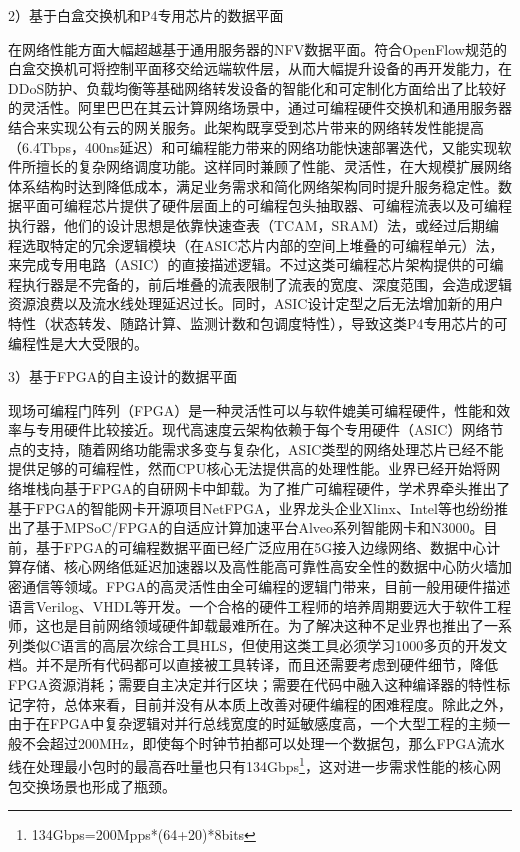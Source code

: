 2）基于白盒交换机和P4专用芯片的数据平面

在网络性能方面大幅超越基于通用服务器的NFV数据平面。符合OpenFlow规范的白盒交换机可将控制平面移交给远端软件层，从而大幅提升设备的再开发能力，在DDoS防护、负载均衡等基础网络转发设备的智能化和可定制化方面给出了比较好的灵活性。阿里巴巴在其云计算网络场景中，通过可编程硬件交换机和通用服务器结合来实现公有云的网关服务。此架构既享受到芯片带来的网络转发性能提高（6.4Tbps，400ns延迟）和可编程能力带来的网络功能快速部署迭代，又能实现软件所擅长的复杂网络调度功能。这样同时兼顾了性能、灵活性，在大规模扩展网络体系结构时达到降低成本，满足业务需求和简化网络架构同时提升服务稳定性。数据平面可编程芯片提供了硬件层面上的可编程包头抽取器、可编程流表以及可编程执行器，他们的设计思想是依靠快速查表（TCAM，SRAM）法，或经过后期编程选取特定的冗余逻辑模块（在ASIC芯片内部的空间上堆叠的可编程单元）法，来完成专用电路（ASIC）的直接描述逻辑。不过这类可编程芯片架构提供的可编程执行器是不完备的，前后堆叠的流表限制了流表的宽度、深度范围，会造成逻辑资源浪费以及流水线处理延迟过长。同时，ASIC设计定型之后无法增加新的用户特性（状态转发、随路计算、监测计数和包调度特性），导致这类P4专用芯片的可编程性是大大受限的。

3）基于FPGA的自主设计的数据平面

现场可编程门阵列（FPGA）是一种灵活性可以与软件媲美可编程硬件，性能和效率与专用硬件比较接近。现代高速度云架构依赖于每个专用硬件（ASIC）网络节点的支持，随着网络功能需求多变与复杂化，ASIC类型的网络处理芯片已经不能提供足够的可编程性，然而CPU核心无法提供高的处理性能。业界已经开始将网络堆栈向基于FPGA的自研网卡中卸载。为了推广可编程硬件，学术界牵头推出了基于FPGA的智能网卡开源项目NetFPGA，业界龙头企业Xlinx、Intel等也纷纷推出了基于MPSoC/FPGA的自适应计算加速平台Alveo系列智能网卡和N3000。目前，基于FPGA的可编程数据平面已经广泛应用在5G接入边缘网络、数据中心计算存储、核心网络低延迟加速器以及高性能高可靠性高安全性的数据中心防火墙加密通信等领域。FPGA的高灵活性由全可编程的逻辑门带来，目前一般用硬件描述语言Verilog、VHDL等开发。一个合格的硬件工程师的培养周期要远大于软件工程师，这也是目前网络领域硬件卸载最难所在。为了解决这种不足业界也推出了一系列类似C语言的高层次综合工具HLS，但使用这类工具必须学习1000多页的开发文档。并不是所有代码都可以直接被工具转译，而且还需要考虑到硬件细节，降低FPGA资源消耗；需要自主决定并行区块；需要在代码中融入这种编译器的特性标记字符，总体来看，目前并没有从本质上改善对硬件编程的困难程度。除此之外，由于在FPGA中复杂逻辑对并行总线宽度的时延敏感度高，一个大型工程的主频一般不会超过200MHz，即使每个时钟节拍都可以处理一个数据包，那么FPGA流水线在处理最小包时的最高吞吐量也只有134Gbps\footnote{134Gbps=200Mpps*(64+20)*8bits}，这对进一步需求性能的核心网包交换场景也形成了瓶颈。

